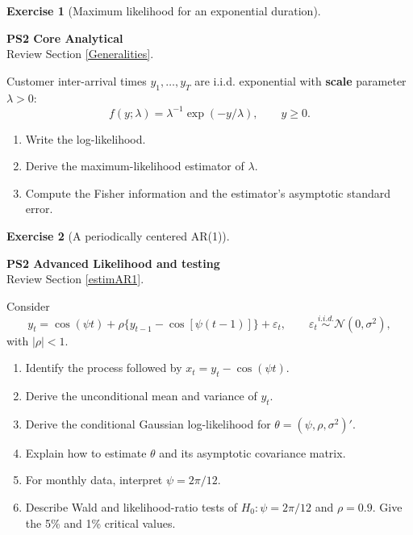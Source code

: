 \documentclass[
  11pt,
]{book}
\providecommand{\tightlist}{%
  \setlength{\itemsep}{0pt}\setlength{\parskip}{0pt}}
\theoremstyle{definition}
\theoremstyle{definition}
\theoremstyle{definition}
\newtheorem{exercise}{Exercise}[chapter]
\theoremstyle{definition}
\theoremstyle{remark}
\begin{document}

\begin{exercisebox}

\begin{exercise}[Maximum likelihood for an exponential duration]
\protect\hypertarget{exr:ex-exponential-mle}{}\label{exr:ex-exponential-mle}

\textbf{PS2 \textbar{} Core \textbar{} Analytical}\\
Review Section \ref{Generalities}.

Customer inter-arrival times \(y_1,\ldots,y_T\) are i.i.d. exponential with \textbf{scale} parameter \(\lambda>0\):
\[f(y;\lambda)=\lambda^{-1}\exp(-y/\lambda),\qquad y\geq0.\]

\begin{enumerate}
\def\labelenumi{\arabic{enumi}.}
\tightlist
\item
  Write the log-likelihood.
\item
  Derive the maximum-likelihood estimator of \(\lambda\).
\item
  Compute the Fisher information and the estimator's asymptotic standard error.
\end{enumerate}

\end{exercise}

\end{exercisebox}


\begin{exercisebox}

\begin{exercise}[A periodically centered AR(1)]
\protect\hypertarget{exr:ex-periodic-process}{}\label{exr:ex-periodic-process}

\textbf{PS2 \textbar{} Advanced \textbar{} Likelihood and testing}\\
Review Section \ref{estimAR1}.

Consider
\[
y_t=\cos(\psi t)+\rho\{y_{t-1}-\cos[\psi(t-1)]\}+\varepsilon_t,
\qquad \varepsilon_t\overset{i.i.d.}{\sim}\mathcal N(0,\sigma^2),
\]
with \(|\rho|<1\).

\begin{enumerate}
\def\labelenumi{\arabic{enumi}.}
\tightlist
\item
  Identify the process followed by \(x_t=y_t-\cos(\psi t)\).
\item
  Derive the unconditional mean and variance of \(y_t\).
\item
  Derive the conditional Gaussian log-likelihood for \(\theta=(\psi,\rho,\sigma^2)'\).
\item
  Explain how to estimate \(\theta\) and its asymptotic covariance matrix.
\item
  For monthly data, interpret \(\psi=2\pi/12\).
\item
  Describe Wald and likelihood-ratio tests of \(H_0:\psi=2\pi/12\) and \(\rho=0.9\). Give the 5\% and 1\% critical values.
\end{enumerate}

\end{exercise}

\end{exercisebox}
\end{document}

